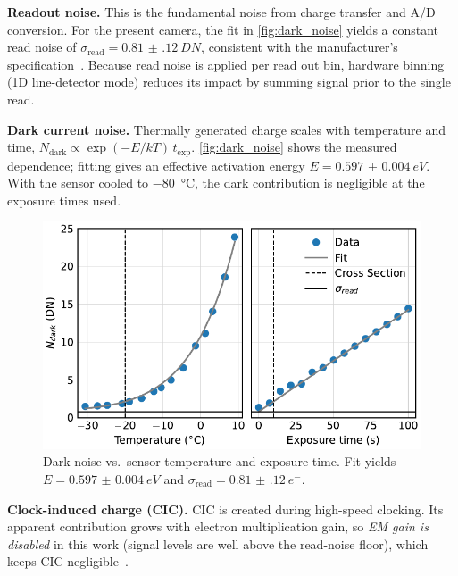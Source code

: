 \documentclass[
	parskip=half,
	a4paper,
]{scrarticle}
\begin{document}
\textbf{Readout noise.}
This is the fundamental noise from charge transfer and A/D conversion. For the present camera, the fit in \autoref{fig:dark_noise} yields a constant read noise of
\(\sigma_{\text{read}}=\SI{0.81(12)}{DN}\), consistent with the manufacturer’s specification~\cite{andorIXonEM897Manual}.
Because read noise is applied per read out bin, hardware binning (1D line-detector mode) reduces its impact by summing signal prior to the single read.

\textbf{Dark current noise.}
Thermally generated charge scales with temperature and time,
\(N_\text{dark}\propto \exp(-E/kT)\,t_\text{exp}\).
\autoref{fig:dark_noise} shows the measured dependence; fitting gives an effective activation energy \(E=\SI{0.597(4)}{eV}\).
With the sensor cooled to \SI{-80}{\degreeCelsius}, the dark contribution is negligible at the exposure times used.

\begin{figure}[h]
    \centering
    \includegraphics{../analysis/figures/dark_noise.pdf}
    \caption{Dark noise vs.\ sensor temperature and exposure time. Fit yields \(E=\SI{0.597(4)}{eV}\) and \(\sigma_{\text{read}}=\SI{0.81(12)}{e^{-}}\).}
    \label{fig:dark_noise}
\end{figure}

\textbf{Clock-induced charge (CIC).}
CIC is created during high-speed clocking.
Its apparent contribution grows with electron multiplication gain, so \emph{EM gain is disabled} in this work (signal levels are well above the read-noise floor), which keeps CIC negligible~\cite{andorEstablishingSensitivityScientifica}.
\end{document}
